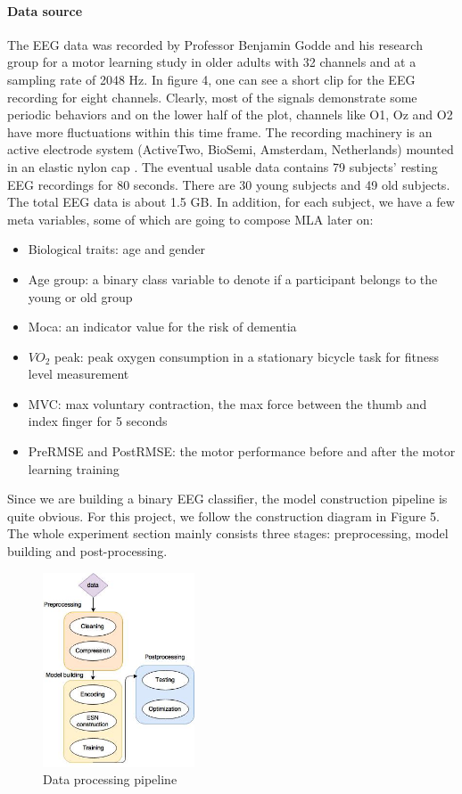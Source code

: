 \documentclass[a4paper,11pt,oneside]{article}
\begin{document}
\paragraph{Data source} The EEG data was recorded by Professor Benjamin Godde and his research group for a motor learning study in older adults with 32 channels and at a sampling rate of 2048 Hz. In figure 4, one can see a short clip for the EEG recording for eight channels. Clearly, most of the signals demonstrate some periodic behaviors and on the lower half of the plot, channels like O1, Oz and O2 have more fluctuations within this time frame.  The recording machinery is an active electrode system (ActiveTwo, BioSemi, Amsterdam, Netherlands) mounted in an elastic nylon cap \cite{jasper1958ten}. The eventual usable data contains 79 subjects' resting EEG recordings for 80 seconds. There are 30 young subjects and 49 old subjects. The total EEG data is about 1.5 GB. In addition, for each subject, we have a few meta variables, some of which are going to compose MLA later on:
\begin{itemize}
	\item Biological traits: age and gender
	\item Age group: a binary class variable to denote if a participant belongs to the young or old group
	\item Moca: an indicator value for the risk of dementia
	\item $VO_2$ peak: peak oxygen consumption in a stationary bicycle task for fitness level measurement
	 \item MVC: max voluntary contraction, the max force between the thumb and index finger for 5 seconds 
	 \item PreRMSE and PostRMSE: the motor performance before and after the motor learning training
\end{itemize}

Since we are building a binary EEG classifier, the model construction pipeline is quite obvious. For this project, we follow the construction diagram in Figure 5. The whole experiment section mainly consists three stages: preprocessing, model building and post-processing.

\begin{figure}
	\begin{center}
		\includegraphics[width=0.40\textwidth]{img/dataflow}
	\end{center}
	\caption{Data processing pipeline}
\end{figure}
\end{document}
